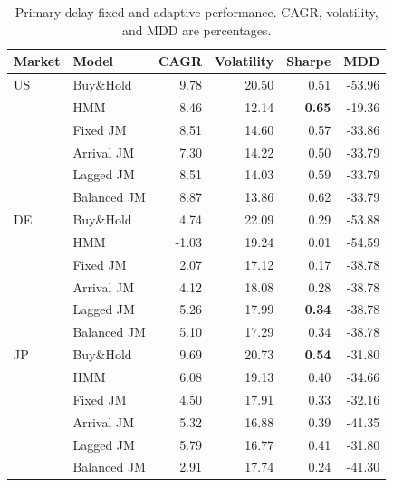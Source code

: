 \documentclass[11pt]{article}
\newcommand{\BH}{Buy\&Hold}
\begin{document}
\begin{table}[!htbp]
\centering
\caption{Primary-delay fixed and adaptive performance. CAGR, volatility, and
MDD are percentages.}
\label{tab:adaptive-risk}
\small
\begin{tabular}{llrrrr}
\toprule
Market & Model & CAGR & Volatility & Sharpe & MDD \\
\midrule
US & \BH{}      & 9.78 & 20.50 & 0.51 & -53.96 \\
   & HMM         & 8.46 & 12.14 & \textbf{0.65} & -19.36 \\
   & Fixed JM    & 8.51 & 14.60 & 0.57 & -33.86 \\
   & Arrival JM  & 7.30 & 14.22 & 0.50 & -33.79 \\
   & Lagged JM   & 8.51 & 14.03 & 0.59 & -33.79 \\
   & Balanced JM & 8.87 & 13.86 & 0.62 & -33.79 \\
\addlinespace
DE & \BH{}      & 4.74 & 22.09 & 0.29 & -53.88 \\
   & HMM         & -1.03 & 19.24 & 0.01 & -54.59 \\
   & Fixed JM    & 2.07 & 17.12 & 0.17 & -38.78 \\
   & Arrival JM  & 4.12 & 18.08 & 0.28 & -38.78 \\
   & Lagged JM   & 5.26 & 17.99 & \textbf{0.34} & -38.78 \\
   & Balanced JM & 5.10 & 17.29 & 0.34 & -38.78 \\
\addlinespace
JP & \BH{}      & 9.69 & 20.73 & \textbf{0.54} & -31.80 \\
   & HMM         & 6.08 & 19.13 & 0.40 & -34.66 \\
   & Fixed JM    & 4.50 & 17.91 & 0.33 & -32.16 \\
   & Arrival JM  & 5.32 & 16.88 & 0.39 & -41.35 \\
   & Lagged JM   & 5.79 & 16.77 & 0.41 & -31.80 \\
   & Balanced JM & 2.91 & 17.74 & 0.24 & -41.30 \\
\bottomrule
\end{tabular}
\end{table}
\end{document}
